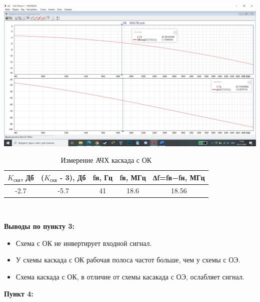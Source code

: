 \documentclass[a4paper,14pt]{extarticle}
\begin{document}
    \begin{center}
        \includegraphics[scale=0.25]{3.3.jpg}
    \end{center}

    \begin{table}[ht]
        \begin{center}
            \caption{Измерение АЧХ каскада с ОК}
            \begin{tabular}{ |c|c|c|c|c| }
                \hline
                $K_{\text{скв}}$, Дб & ($K_{\text{скв}}$ - 3), Дб&fн, Гц & fв, МГц & ∆f=fв−fн, МГц \\
                \hline 
                -2.7 & -5.7 & 41 & 18.6 & 18.56\\
                \hline
            \end{tabular}\\
        \end{center}
    \end{table}
    \textbf{Выводы по пункту 3:}
    \vspace{-6ex}
    \begin{singlespace}
        \begin{itemize}
            \item Схема с ОК не инвертирует входной сигнал.
            \item У схемы каскада с ОК рабочая полоса частот больше, чем у схемы с ОЭ.
            \item Схема каскада с ОК, в отличие от схемы касакада с ОЭ, ослабляет сигнал. 
        \end{itemize}
    \end{singlespace}


    \newpage
    \textbf{Пункт 4:}
\end{document}
